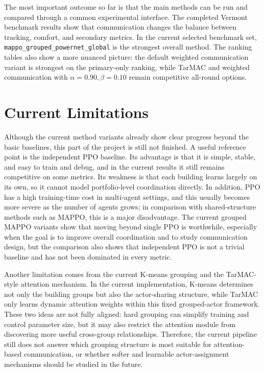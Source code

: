 The most important outcome so far is that the main methods can be run and
compared through a common experimental interface. The completed Vermont
benchmark results show that communication changes the balance between tracking,
comfort, and secondary metrics. In the current selected benchmark set,
\texttt{mappo\_grouped\_powernet\_global} is the strongest overall
method. The ranking tables also show a more nuanced picture:
the default weighted communication variant is strongest on the primary-only
ranking, while TarMAC and weighted communication with
\mbox{$\alpha=0.90, \beta=0.10$} remain competitive all-round options.

\section{Current Limitations}

Although the current method variants already show clear progress beyond the
basic baselines, this part of the project is still not finished. A useful
reference point is the independent PPO baseline. Its advantage is that it is
simple, stable, and easy to train and debug, and in the current results it
still remains competitive on some metrics. Its weakness is that each building
learns largely on its own, so it cannot model portfolio-level coordination
directly. In addition, PPO has a high training-time cost in multi-agent
settings, and this usually becomes more severe as the number of agents grows; in
comparison with shared-structure methods such as MAPPO, this is a major
disadvantage. The current grouped MAPPO variants show that moving beyond single
PPO is worthwhile, especially when the goal is to improve overall coordination
and to study communication design, but the comparison also shows that
independent PPO is not a trivial baseline and has not been dominated in every
metric.

Another limitation comes from the current K-means grouping and the TarMAC-style
attention mechanism. In the current implementation, K-means determines not only
the building groups but also the actor-sharing structure, while TarMAC only
learns dynamic attention weights within this fixed grouped-actor framework.
These two ideas are not fully aligned: hard grouping can simplify training and
control parameter size, but it may also restrict the attention module from
discovering more useful cross-group relationships. Therefore, the current
pipeline still does not answer which grouping structure is most suitable for
attention-based communication, or whether softer and learnable actor-assignment
mechanisms should be studied in the future.


